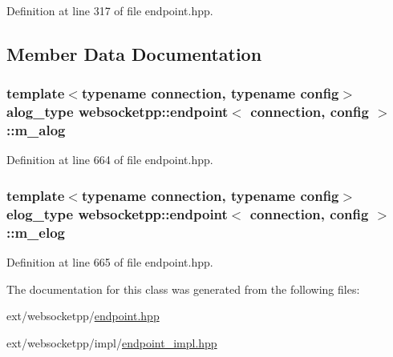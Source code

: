 Definition at line 317 of file endpoint.\+hpp.



\subsection{Member Data Documentation}
\hypertarget{classwebsocketpp_1_1endpoint_ab77acb19adafe52f5c28aa387077cfbc}{}
\subsubsection[{m\+\_\+alog}]{\setlength{\rightskip}{0pt plus 5cm}template$<$typename connection, typename config$>$ {\bf alog\+\_\+type} {\bf websocketpp\+::endpoint}$<$ {\bf connection}, config $>$\+::m\+\_\+alog\hspace{0.3cm}{\ttfamily [protected]}}\label{classwebsocketpp_1_1endpoint_ab77acb19adafe52f5c28aa387077cfbc}


Definition at line 664 of file endpoint.\+hpp.

\hypertarget{classwebsocketpp_1_1endpoint_a46d6afb6f4f1541da167230c8c1e6f9a}{}
\subsubsection[{m\+\_\+elog}]{\setlength{\rightskip}{0pt plus 5cm}template$<$typename connection, typename config$>$ {\bf elog\+\_\+type} {\bf websocketpp\+::endpoint}$<$ {\bf connection}, config $>$\+::m\+\_\+elog\hspace{0.3cm}{\ttfamily [protected]}}\label{classwebsocketpp_1_1endpoint_a46d6afb6f4f1541da167230c8c1e6f9a}


Definition at line 665 of file endpoint.\+hpp.



The documentation for this class was generated from the following files\+:\begin{DoxyCompactItemize}
\item 
ext/websocketpp/\hyperlink{websocketpp_2endpoint_8hpp}{endpoint.\+hpp}\item 
ext/websocketpp/impl/\hyperlink{endpoint__impl_8hpp}{endpoint\+\_\+impl.\+hpp}\end{DoxyCompactItemize}
